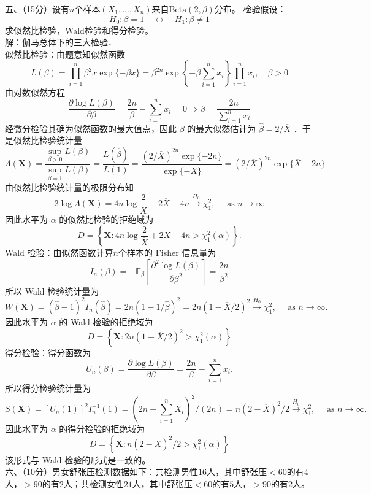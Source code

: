 \documentclass[UTF8,openany]{book}
\begin{document}
	
	\noindent 五、（15分）设有$n$个样本$(X_1,...,X_n)$来自$\mathrm{Beta}(2,\beta)$分布。
	检验假设：
	\[
	H_0: \beta = 1 \quad \leftrightarrow \quad H_1: \beta \neq 1
	\]
	求似然比检验，Wald检验和得分检验。\\
	解：伽马总体下的三大检验．\\
	似然比检验：由题意知似然函数
	$$
	L(\beta)=\prod_{i=1}^n \beta^2 x \exp \{-\beta x\}=\beta^{2 n} \exp \left\{-\beta \sum_{i=1}^n x_i\right\} \prod_{i=1}^n x_i, \quad \beta>0
	$$
	由对数似然方程
	$$
	\frac{\partial \log L(\beta)}{\partial \beta}=\frac{2 n}{\beta}-\sum_{i=1}^n x_i=0 \Rightarrow \beta=\frac{2 n}{\sum_{i=1}^n x_i}
	$$
	经微分检验其确为似然函数的最大值点，因此 $\beta$ 的最大似然估计为 $\hat{\beta}=2 / \overline{X}$ ．于是似然比检验统计量
	$$
	\Lambda(\boldsymbol{X})=\frac{\sup _{\beta>0} L(\beta)}{\sup _{\beta=1} L(\beta)}=\frac{L(\hat{\beta})}{L(1)}=\frac{(2 / \overline{X})^{2 n} \exp \{-2 n\}}{\exp \{-\overline{X}\}}=(2 / \overline{X})^{2 n} \exp \{\overline{X}-2 n\}
	$$
	由似然比检验统计量的极限分布知
	$$
	2 \log \Lambda(\boldsymbol{X})=4 n \log \frac{2}{\overline{X}}+2 \overline{X}-4 n \xrightarrow{H_0} \chi_1^2, \quad \text { as } n \rightarrow \infty
	$$
	因此水平为 $\alpha$ 的似然比检验的拒绝域为
	$$
	D=\left\{\boldsymbol{X}: 4 n \log \frac{2}{\overline{X}}+2 \overline{X}-4 n>\chi_1^2(\alpha)\right\} .
	$$
	Wald 检验：由似然函数计算$n$个样本的 Fisher 信息量为
	$$
	I_n(\beta)=-\mathbb{E}_\beta\left[\frac{\partial^2 \log L(\beta)}{\partial \beta^2}\right]=\frac{2 n}{\beta^2}
	$$
	所以 Wald 检验统计量为
	$$
	W(\boldsymbol{X})=(\hat{\beta}-1)^2 I_n(\hat{\beta})=2 n(1-1 / \hat{\beta})^2=2 n(1-\overline{X} / 2)^2 \xrightarrow{H_0} \chi_1^2, \quad \text { as } n \rightarrow \infty .
	$$
	因此水平为 $\alpha$ 的 Wald 检验的拒绝域为 
	$$D=\left\{\boldsymbol{X}: 2 n(1-\overline{X} / 2)^2>\chi_1^2(\alpha)\right\}$$
	得分检验：得分函数为
	$$
	U_n(\beta)=\frac{\partial \log L(\beta)}{\partial \beta}=\frac{2 n}{\beta}-\sum_{i=1}^n x_i .
	$$
	所以得分检验统计量为
	$$
	S(\boldsymbol{X})=\left[U_n(1)\right]^2 I_n^{-1}(1)=\left(2 n-\sum_{i=1}^n X_i\right)^2 /(2 n)=n(2-\overline{X})^2 / 2 \xrightarrow{H_0} \chi_1^2, \quad \text { as } n \rightarrow \infty .
	$$
	因此水平为 $\alpha$ 的得分检验的拒绝域为 
	$$D=\left\{\boldsymbol{X}: n(2-\overline{X})^2 / 2>\chi_1^2(\alpha)\right\}$$
	该形式与 Wald 检验的形式是一致的。\\
	
	
	
	
	
	\noindent 六、（10分）男女舒张压检测数据如下：共检测男性$16$人，其中舒张压$<60$的有$4$人，$>90$的有$2$人；共检测女性$21$人，其中舒张压$<60$的有$5$人，$>90$的有$2$人。
	
\end{document}
